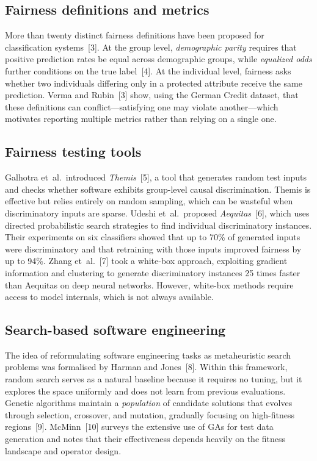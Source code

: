 \documentclass[10pt]{article}
\begin{document}
\subsection{Fairness definitions and metrics}
More than twenty distinct fairness definitions have been proposed for classification
systems~[3].  At the group level, \emph{demographic parity} requires that positive
prediction rates be equal across demographic groups, while \emph{equalized odds} further
conditions on the true label~[4].  At the individual level, fairness asks whether two
individuals differing only in a protected attribute receive the same prediction.
Verma and Rubin~[3] show, using the German Credit dataset, that these definitions can
conflict---satisfying one may violate another---which motivates reporting multiple
metrics rather than relying on a single one.

\subsection{Fairness testing tools}
Galhotra et~al.\ introduced \textit{Themis}~[5], a tool that generates random test
inputs and checks whether software exhibits group-level causal discrimination.  Themis
is effective but relies entirely on random sampling, which can be wasteful when
discriminatory inputs are sparse.  Udeshi et~al.\ proposed \textit{Aequitas}~[6], which
uses directed probabilistic search strategies to find individual discriminatory
instances.  Their experiments on six classifiers showed that up to 70\% of generated
inputs were discriminatory and that retraining with those inputs improved fairness by up
to 94\%.  Zhang et~al.~[7] took a white-box approach, exploiting gradient information
and clustering to generate discriminatory instances 25 times faster than Aequitas on
deep neural networks.  However, white-box methods require access to model internals,
which is not always available.

\subsection{Search-based software engineering}
The idea of reformulating software engineering tasks as metaheuristic search problems
was formalised by Harman and Jones~[8].  Within this framework, random search serves as
a natural baseline because it requires no tuning, but it explores the space uniformly
and does not learn from previous evaluations.  Genetic algorithms maintain a
\emph{population} of candidate solutions that evolves through selection, crossover, and
mutation, gradually focusing on high-fitness regions~[9].  McMinn~[10] surveys the
extensive use of GAs for test data generation and notes that their effectiveness depends
heavily on the fitness landscape and operator design.
\end{document}
